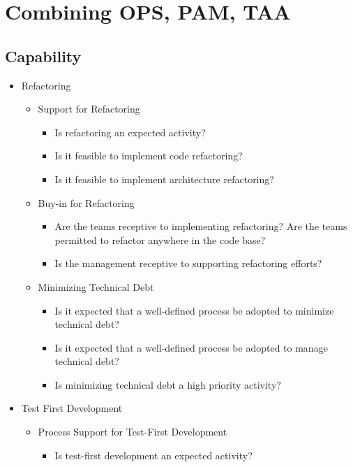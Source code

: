 \chapter{Combining OPS, PAM, TAA}
\label{ch:ops_pam_taa}

\section{Capability}

\begin{itemize}
	\item Refactoring
		\begin{itemize}
			\item Support for Refactoring 
				\begin{itemize}
					\item Is refactoring an expected activity?
					\item Is it feasible to implement code refactoring?
					\item Is it feasible to implement architecture refactoring?
				\end{itemize}
			\item Buy-in for Refactoring
				\begin{itemize}
					\item Are the teams receptive to implementing refactoring?
					\addition Are the teams permitted to refactor anywhere in the code base?
					\item Is the management receptive to supporting refactoring efforts?
				\end{itemize}
			\item Minimizing Technical Debt
				\begin{itemize}
					\item Is it expected that a well-defined process be adopted to minimize technical debt?
					\item Is it expected that a well-defined process be adopted to manage technical debt?
					\item Is minimizing technical debt a high priority activity?
				\end{itemize}
		\end{itemize}	
	\item Test First Development
		\begin{itemize}
			\item Process Support for Test-First Development
				\begin{itemize}
					\item Is test-first development an expected activity?

\end{itemize}
\end{itemize}
\end{itemize}
